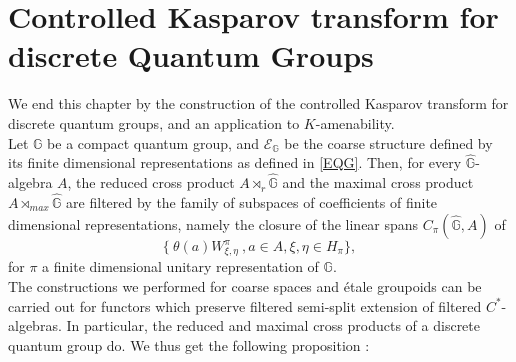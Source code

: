 \section{Controlled Kasparov transform for discrete Quantum Groups}

We end this chapter by the construction of the controlled Kasparov transform for discrete quantum groups, and an application to $K$-amenability.\\

Let $\mathbb G$ be a compact quantum group, and $\mathcal E_{\mathbb G}$ be the coarse structure defined by its finite dimensional representations as defined in \ref{EQG}. Then, for every $\hat{\mathbb G}$-algebra $A$, the reduced cross product $A\rtimes_r \hat{\mathbb G}$ and the maximal cross product $A\rtimes_{max}\hat{\mathbb G}$ are filtered by the family of subspaces of coefficients of finite dimensional representations, namely the closure of the linear spans $C_{\pi}(\hat{\mathbb G},A)$ of
\[\{ \ \theta(a)W^\pi_{\xi,\eta} \ , a\in A, \xi,\eta\in H_\pi\},\]
for $\pi$ a finite dimensional unitary representation of $\mathbb G$.\\

The constructions we performed for coarse spaces and étale groupoids can be carried out for functors which preserve filtered semi-split extension of filtered $C^*$-algebras. In particular, the reduced and maximal cross products of a discrete quantum group do. We thus get the following proposition :

